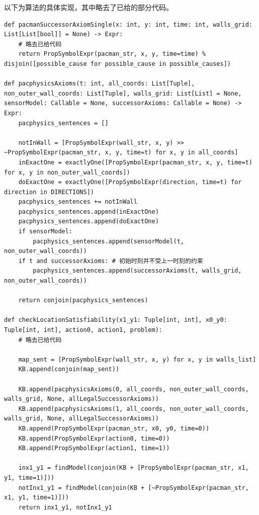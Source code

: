 以下为算法的具体实现，其中略去了已给的部分代码。
\begin{lstlisting}[emph={[3]x,y,time,sensorModel,successorAxioms,action0,action1,problem},emphstyle={[3]\color{vscode_parametercolor}},emph={[4]Expr,SearchProblem,Callable,Node,Actions,Reached,Any,List,Tuple},emphstyle={[4]\color{vscode_classcolor}}]
def pacmanSuccessorAxiomSingle(x: int, y: int, time: int, walls_grid: List[List[bool]] = None) -> Expr:
    # 略去已给代码
    return PropSymbolExpr(pacman_str, x, y, time=time) % disjoin([possible_cause for possible_cause in possible_causes])

def pacphysicsAxioms(t: int, all_coords: List[Tuple], non_outer_wall_coords: List[Tuple], walls_grid: List[List] = None, sensorModel: Callable = None, successorAxioms: Callable = None) -> Expr:
    pacphysics_sentences = []

    notInWall = [PropSymbolExpr(wall_str, x, y) >> ~PropSymbolExpr(pacman_str, x, y, time=t) for x, y in all_coords]
    inExactOne = exactlyOne([PropSymbolExpr(pacman_str, x, y, time=t) for x, y in non_outer_wall_coords])
    doExactOne = exactlyOne([PropSymbolExpr(direction, time=t) for direction in DIRECTIONS])
    pacphysics_sentences += notInWall
    pacphysics_sentences.append(inExactOne)
    pacphysics_sentences.append(doExactOne)
    if sensorModel:
        pacphysics_sentences.append(sensorModel(t, non_outer_wall_coords))
    if t and successorAxioms: # 初始时刻并不受上一时刻的约束
        pacphysics_sentences.append(successorAxioms(t, walls_grid, non_outer_wall_coords))

    return conjoin(pacphysics_sentences)

def checkLocationSatisfiability(x1_y1: Tuple[int, int], x0_y0: Tuple[int, int], action0, action1, problem):
    # 略去已给代码

    map_sent = [PropSymbolExpr(wall_str, x, y) for x, y in walls_list]
    KB.append(conjoin(map_sent))

    KB.append(pacphysicsAxioms(0, all_coords, non_outer_wall_coords, walls_grid, None, allLegalSuccessorAxioms))
    KB.append(pacphysicsAxioms(1, all_coords, non_outer_wall_coords, walls_grid, None, allLegalSuccessorAxioms))
    KB.append(PropSymbolExpr(pacman_str, x0, y0, time=0))
    KB.append(PropSymbolExpr(action0, time=0))
    KB.append(PropSymbolExpr(action1, time=1))

    inx1_y1 = findModel(conjoin(KB + [PropSymbolExpr(pacman_str, x1, y1, time=1)]))
    notInx1_y1 = findModel(conjoin(KB + [~PropSymbolExpr(pacman_str, x1, y1, time=1)]))
    return inx1_y1, notInx1_y1


\end{lstlisting}
